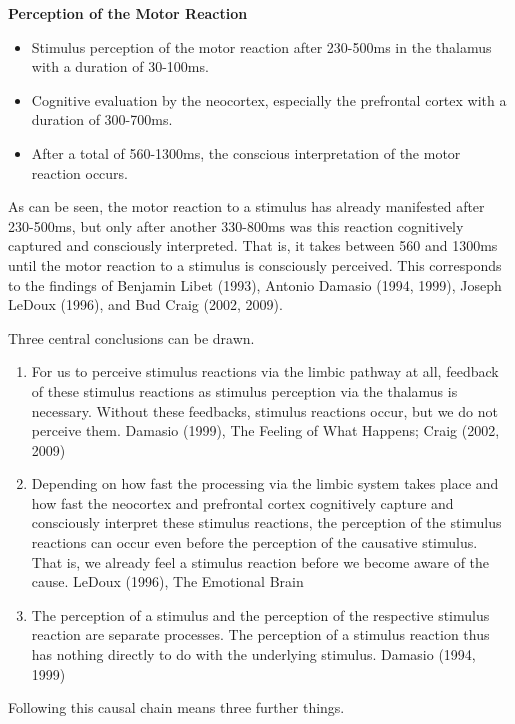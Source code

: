 \textbf{Perception of the Motor Reaction}

\begin{itemize}
  \item Stimulus perception of the motor reaction after 230-500ms in the thalamus with a duration of 30-100ms.
  \item Cognitive evaluation by the neocortex, especially the prefrontal cortex with a duration of 300-700ms.
  \item After a total of 560-1300ms, the conscious interpretation of the motor reaction occurs.
\end{itemize}
As can be seen, the motor reaction to a stimulus has already manifested after 230-500ms, but only after another 330-800ms was this reaction cognitively captured and consciously interpreted. That is, it takes between 560 and 1300ms until the motor reaction to a stimulus is consciously perceived. This corresponds to the findings of Benjamin Libet (1993), Antonio Damasio (1994, 1999), Joseph LeDoux (1996), and Bud Craig (2002, 2009).

Three central conclusions can be drawn.

\begin{enumerate}
  \item For us to perceive stimulus reactions via the limbic pathway at all, feedback of these stimulus reactions as stimulus perception via the thalamus is necessary. Without these feedbacks, stimulus reactions occur, but we do not perceive them. Damasio (1999), The Feeling of What Happens; Craig (2002, 2009)
  \item Depending on how fast the processing via the limbic system takes place and how fast the neocortex and prefrontal cortex cognitively capture and consciously interpret these stimulus reactions, the perception of the stimulus reactions can occur even before the perception of the causative stimulus. That is, we already feel a stimulus reaction before we become aware of the cause. LeDoux (1996), The Emotional Brain
  \item The perception of a stimulus and the perception of the respective stimulus reaction are separate processes. The perception of a stimulus reaction thus has nothing directly to do with the underlying stimulus. Damasio (1994, 1999)
\end{enumerate}

Following this causal chain means three further things.

